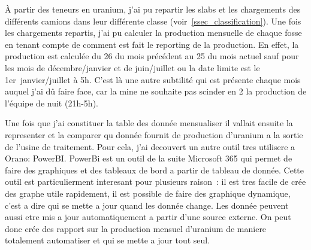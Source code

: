 À partir des teneurs en uranium, j'ai pu repartir les slabs et les chargements des différents camions dans leur différente classe (voir~\cref{ssec_classification}). Une fois les chargements repartis, j'ai pu calculer la production mensuelle de chaque fosse en tenant compte de comment est fait le reporting de la production. En effet, la production est calculée du 26 du mois précédent au 25 du mois actuel sauf pour les mois de décembre/janvier et de juin/juillet ou la date limite est le 1er~janvier/juillet à 5h. C'est là une autre subtilité qui est présente chaque mois auquel j'ai dû faire face, car la mine ne souhaite pas scinder en 2 la production de l'équipe de nuit (21h-5h).

Une fois que j'ai constituer la table des donnée mensualiser il vallait ensuite la representer et la comparer qu donnée fournit de production d'uranium a la sortie de l'usine de traitement. Pour cela, j'ai decouvert un autre outil tres utilisere a Orano: PowerBI. PowerBi est un outil de la suite Microsoft 365 qui permet de faire des graphiques et des tableaux de bord a partir de tableau de donnée. Cette outil est particulierment interesant pour plusieurs raison~: il est tres facile de crée des graphe utile rapidement, il est possible de faire des graphique dynamique, c'est a dire qui se mette a jour quand les donnée change. Les donnée peuvent aussi etre mis a jour automatiquement a partir d'une source externe. On peut donc crée des rapport sur la production mensuel d'uranium de maniere totalement automatiser et qui se mette a jour tout seul.